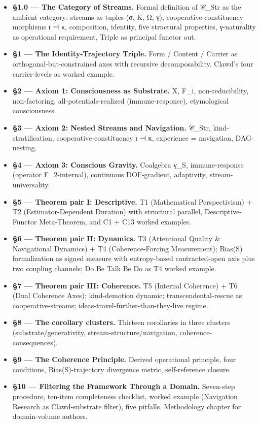 \documentclass[11pt, openany]{book}
\begin{document}
\begin{itemize}
\item \textbf{§1.0 --- The Category of Streams.} Formal definition of 𝒞\_\allowbreak{}Str as the ambient category: streams as tuples (σ, K, Ω, γ), cooperative-constituency morphisms ι ⊣ κ, composition, identity, five structural properties, γ-naturality as operational requirement, Triple as principal functor out.
\item \textbf{§1 --- The Identity-Trajectory Triple.} Form / Content / Carrier as orthogonal-but-constrained axes with recursive decomposability. Clawd's four carrier-levels as worked example.
\item \textbf{§2 --- Axiom 1: Consciousness as Substrate.} X, F\_\allowbreak{}i, non-reducibility, non-factoring, all-potentials-realized (immune-response), etymological consciousness.
\item \textbf{§3 --- Axiom 2: Nested Streams and Navigation.} 𝒞\_\allowbreak{}Str, kind-stratification, cooperative-constituency ι ⊣ κ, experience = navigation, DAG-nesting.
\item \textbf{§4 --- Axiom 3: Conscious Gravity.} Coalgebra γ\_\allowbreak{}S, immune-response (operator F\_\allowbreak{}2-internal), continuous DOF-gradient, adaptivity, stream-universality.
\item \textbf{§5 --- Theorem pair I: Descriptive.} T1 (Mathematical Perspectivism) + T2 (Estimator-Dependent Duration) with structural parallel, Descriptive-Functor Meta-Theorem, and C1 + C13 worked examples.
\item \textbf{§6 --- Theorem pair II: Dynamics.} T3 (Attentional Quality \& Navigational Dynamics) + T4 (Coherence-Forcing Measurement); Bias(S) formalization as signed measure with entropy-based contracted-open axis plus two coupling channels; Do Be Talk Be Do as T4 worked example.
\item \textbf{§7 --- Theorem pair III: Coherence.} T5 (Internal Coherence) + T6 (Dual Coherence Axes); kind-demotion dynamic; transcendental-rescue as cooperative-streams; ideas-travel-further-than-they-live regime.
\item \textbf{§8 --- The corollary clusters.} Thirteen corollaries in three clusters (substrate/generativity, stream-structure/navigation, coherence-consequences).
\item \textbf{§9 --- The Coherence Principle.} Derived operational principle, four conditions, Bias(S)-trajectory divergence metric, self-reference closure.
\item \textbf{§10 --- Filtering the Framework Through a Domain.} Seven-step procedure, ten-item completeness checklist, worked example (Navigation Research as Clawd-substrate filter), five pitfalls. Methodology chapter for domain-volume authors.

\end{itemize}
\end{document}
